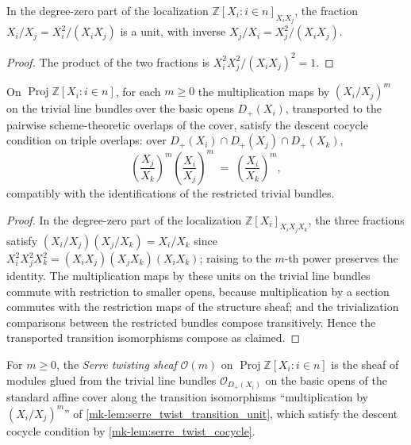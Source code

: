 \begin{lemma}
  \label{mk-lem:serre_twist_transition_unit}
  \leanok
  In the degree-zero part of the localization
  \(\mathbb{Z}[X_i : i \in n]_{X_i X_j}\), the fraction
  \(X_i/X_j = X_i^2/(X_i X_j)\) is a unit, with inverse
  \(X_j/X_i = X_j^2/(X_i X_j)\).
\end{lemma}

\begin{proof}
  \leanok
  The product of the two fractions is
  \(X_i^2 X_j^2 / (X_i X_j)^2 = 1\).
\end{proof}

\begin{lemma}
  \label{mk-lem:serre_twist_cocycle}
  \leanok
  On \(\operatorname{Proj} \mathbb{Z}[X_i : i \in n]\), for each \(m \ge 0\)
  the multiplication maps by \((X_i/X_j)^m\) on the trivial line bundles over
  the basic opens \(D_+(X_i)\), transported to the pairwise scheme-theoretic
  overlaps of the cover, satisfy the descent cocycle condition on triple
  overlaps: over \(D_+(X_i) \cap D_+(X_j) \cap D_+(X_k)\),
  \[
    \left(\frac{X_j}{X_k}\right)^{m}
    \left(\frac{X_i}{X_j}\right)^{m}
    \;=\; \left(\frac{X_i}{X_k}\right)^{m},
  \]
  compatibly with the identifications of the restricted trivial bundles.
\end{lemma}

\begin{proof}
  In the degree-zero part of the localization
  \(\mathbb{Z}[X_i]_{X_i X_j X_k}\), the three fractions satisfy
  \((X_i/X_j)(X_j/X_k) = X_i/X_k\) since
  \(X_i^2 X_j^2 X_k^2 = (X_i X_j)(X_j X_k)(X_i X_k)\); raising to the
  \(m\)-th power preserves the identity.  The multiplication maps by these
  units on the trivial line bundles commute with restriction to smaller
  opens, because multiplication by a section commutes with the restriction
  maps of the structure sheaf; and the trivialization comparisons between
  the restricted bundles compose transitively.  Hence the transported
  transition isomorphisms compose as claimed.
\end{proof}

\begin{definition}
  \label{mk-def:serre_twist}
  \leanok
  For \(m \ge 0\), the \emph{Serre twisting sheaf} \(\mathcal{O}(m)\) on
  \(\operatorname{Proj} \mathbb{Z}[X_i : i \in n]\) is the sheaf of modules
  glued from the trivial line bundles \(\mathcal{O}_{D_+(X_i)}\) on the
  basic opens of the standard affine cover along the transition
  isomorphisms ``multiplication by \((X_i/X_j)^m\)'' of
  \ref{mk-lem:serre_twist_transition_unit}, which satisfy the descent cocycle
  condition by \ref{mk-lem:serre_twist_cocycle}.
\end{definition}

